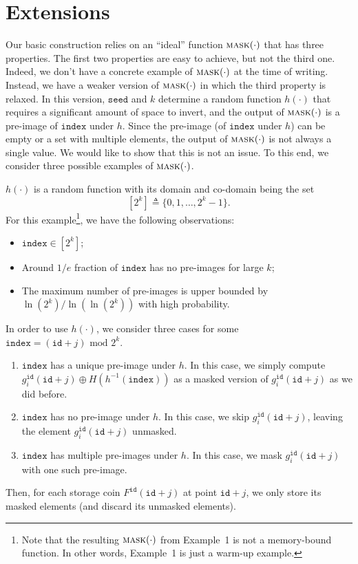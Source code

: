 \documentclass[12pt,draftcls,onecolumn]{IEEEtran}
\newcommand{\id}{\texttt{id}}
\newcommand{\seed}{\texttt{seed}}
\newcommand{\ind}{\texttt{index}}
\newcommand{\mask}{\textsc{mask}}
\begin{document}
\section{Extensions}

Our basic construction relies on an ``ideal'' function $\mask(\cdot)$ that has three properties. The first two properties are easy to achieve, but not the third one. Indeed, we don't have a concrete example of $\mask(\cdot)$ at the time of writing. Instead, we have a weaker version of $\mask(\cdot)$ in which the third property is relaxed. In this version, $\seed$ and $k$ determine a random function $h(\cdot)$ that requires a significant amount 
of space to invert, and the output of $\mask(\cdot)$ is a pre-image of $\ind$ under $h$. Since the pre-image (of $\ind$ under $h$) can be empty or a set with multiple elements, the output of $\mask(\cdot)$ is not always a single value. We would like to show that this is not an issue.
To this end, we consider three possible examples of $\mask(\cdot)$.

 $h(\cdot)$ is a random function with its domain and co-domain being the set
\[
[2^k] \triangleq \{ 0, 1, \ldots, 2^k - 1  \}.
\]
For this example\footnote{Note that the resulting $\mask(\cdot)$ from Example~1 is not a memory-bound function. In other words, Example~1 is just a warm-up example.}, we have the following observations:
\begin{itemize}
    \item $\ind \in [2^k]$;
    \item Around $1/e$ fraction of $\ind$ has no pre-images for large $k$;
    \item The maximum number of pre-images is upper bounded by $\ln(2^k)/\ln\left( \ln(2^k) \right)$ with high probability.
\end{itemize}

In order to use $h(\cdot)$, we consider three cases for some $\ind = (\id + j) \mbox{ mod } 2^k$.
\begin{enumerate}
    \item $\ind$ has a unique pre-image under $h$. In this case, we simply compute $g_i^{\id}(\id + j) \oplus H\left( h^{-1}(\ind) \right)$ as a masked version of $g_i^{\id}(\id + j)$ as we did before.
    \item $\ind$ has no pre-image under $h$. In this case, we skip $g_i^{\id}(\id + j)$, leaving the element $g_i^{\id}(\id + j)$ unmasked.
    \item $\ind$ has multiple pre-images under $h$. In this case, we mask $g_i^{\id}(\id + j)$ with one such pre-image.
\end{enumerate}
Then, for each storage coin $F^{\id}(\id + j)$ at point $\id + j$, we only store its masked elements (and discard its unmasked elements).
\end{document}
